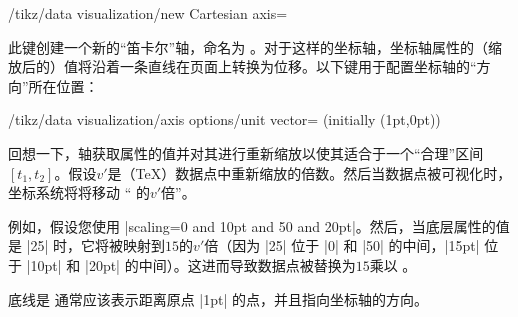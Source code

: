 \begin{key}{/tikz/data visualization/new Cartesian axis=} %

    此键创建一个新的``笛卡尔''轴，命名为 。对于这样的坐标轴，坐标轴属性的（缩放后的）值将沿着一条直线在页面上转换为位移。以下键用于配置坐标轴的``方向''所在位置：
    \begin{key}{/tikz/data visualization/axis options/unit vector= (initially {(1pt,0pt)})} %

        回想一下，轴获取属性的值并对其进行重新缩放以使其适合于一个``合理''区间$[t_1,t_2]$。假设$v'$是（\TeX）数据点中重新缩放的倍数。然后当数据点被可视化时，坐标系统将将移动 `` 的$v'$倍''。


        例如，假设您使用 |scaling=0 and 10pt and 50 and 20pt|。然后，当底层属性的值是 |25| 时，它将被映射到$15$的$v'$倍（因为 |25| 位于 |0| 和 |50| 的中间，|15pt| 位于 |10pt| 和 |20pt| 的中间）。这进而导致数据点被替换为$15$乘以 。


        底线是  通常应该表示距离原点 |1pt| 的点，并且指向坐标轴的方向。
\begin{codeexample}[preamble={\usetikzlibrary{datavisualization}}]
\end{codeexample}
\end{key}
\end{key}

